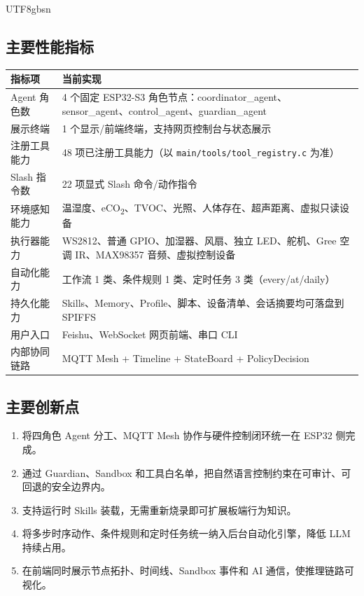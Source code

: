 \documentclass[a4paper,12pt]{article}
\begin{document}
\begin{CJK*}{UTF8}{gbsn}
\subsection{主要性能指标}
\begin{table}[h]
\centering
\begin{tabular}{p{4.2cm}p{8.6cm}}
\toprule
\textbf{指标项} & \textbf{当前实现} \\
\midrule
Agent 角色数 & 4 个固定 ESP32-S3 角色节点：coordinator\_agent、sensor\_agent、control\_agent、guardian\_agent \\
展示终端 & 1 个显示/前端终端，支持网页控制台与状态展示 \\
注册工具能力 & 48 项已注册工具能力（以 \texttt{main/tools/tool\_registry.c} 为准） \\
Slash 指令数 & 22 项显式 Slash 命令/动作指令 \\
环境感知能力 & 温湿度、eCO\textsubscript{2}、TVOC、光照、人体存在、超声距离、虚拟只读设备 \\
执行器能力 & WS2812、普通 GPIO、加湿器、风扇、独立 LED、舵机、Gree 空调 IR、MAX98357 音频、虚拟控制设备 \\
自动化能力 & 工作流 1 类、条件规则 1 类、定时任务 3 类（every/at/daily） \\
持久化能力 & Skills、Memory、Profile、脚本、设备清单、会话摘要均可落盘到 SPIFFS \\
用户入口 & Feishu、WebSocket 网页前端、串口 CLI \\
内部协同链路 & MQTT Mesh + Timeline + StateBoard + PolicyDecision \\
\bottomrule
\end{tabular}
\end{table}

\subsection{主要创新点}
\begin{enumerate}
  \item 将四角色 Agent 分工、MQTT Mesh 协作与硬件控制闭环统一在 ESP32 侧完成。
  \item 通过 Guardian、Sandbox 和工具白名单，把自然语言控制约束在可审计、可回退的安全边界内。
  \item 支持运行时 Skills 装载，无需重新烧录即可扩展板端行为知识。
  \item 将多步时序动作、条件规则和定时任务统一纳入后台自动化引擎，降低 LLM 持续占用。
  \item 在前端同时展示节点拓扑、时间线、Sandbox 事件和 AI 通信，使推理链路可视化。
\end{enumerate}


\end{CJK*}
\end{document}
